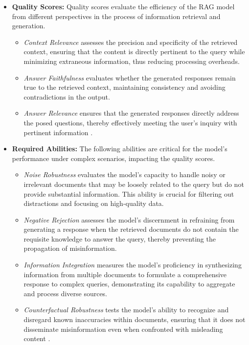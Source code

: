 \begin{itemize}
    \item \textbf{Quality Scores:} Quality scores evaluate the efficiency of the RAG model from different perspectives in the process of information retrieval and generation. 
    \begin{itemize}
        \item \textit{Context Relevance} assesses the precision and specificity of the retrieved context, ensuring that the content is directly pertinent to the query while minimizing extraneous information, thus reducing processing overheads.
        \item \textit{Answer Faithfulness} evaluates whether the generated responses remain true to the retrieved context, maintaining consistency and avoiding contradictions in the output.
        \item \textit{Answer Relevance} ensures that the generated responses directly address the posed questions, thereby effectively meeting the user's inquiry with pertinent information \cite{es2023ragas, saad2023ares}.
    \end{itemize}

    \item \textbf{Required Abilities:} The following abilities are critical for the model’s performance under complex scenarios, impacting the quality scores.
    \begin{itemize}
        \item \textit{Noise Robustness} evaluates the model’s capacity to handle noisy or irrelevant documents that may be loosely related to the query but do not provide substantial information. This ability is crucial for filtering out distractions and focusing on high-quality data.
        \item \textit{Negative Rejection} assesses the model’s discernment in refraining from generating a response when the retrieved documents do not contain the requisite knowledge to answer the query, thereby preventing the propagation of misinformation.
        \item \textit{Information Integration} measures the model’s proficiency in synthesizing information from multiple documents to formulate a comprehensive response to complex queries, demonstrating its capability to aggregate and process diverse sources.
        \item \textit{Counterfactual Robustness} tests the model’s ability to recognize and disregard known inaccuracies within documents, ensuring that it does not disseminate misinformation even when confronted with misleading content \cite{chen2024benchmarking, liu2023recall}.
    \end{itemize}
\end{itemize}

